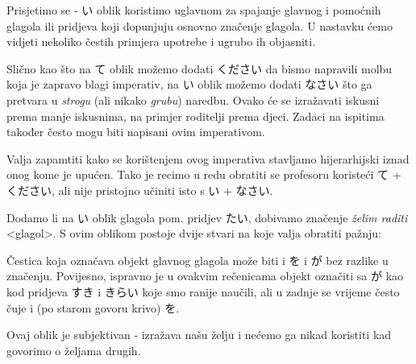 
\author{Tomislav Mamić}

	
	Prisjetimo se - い oblik koristimo uglavnom za spajanje glavnog i pomoćnih glagola ili pridjeva koji dopunjuju osnovno značenje glagola. U nastavku ćemo vidjeti nekoliko čestih primjera upotrebe i ugrubo ih objasniti.
	
	
	Slično kao što na て oblik možemo dodati ください da bismo napravili molbu koja je zapravo blagi imperativ, na い oblik možemo dodati なさい što ga pretvara u \textit{strogu} (ali nikako \textit{grubu}) naredbu. Ovako će se izražavati iskusni prema manje iskusnima, na primjer roditelji prema djeci. Zadaci na ispitima također često mogu biti napisani ovim imperativom.
	
	\begin{reibun}
	\end{reibun}

	Valja zapamtiti kako se korištenjem ovog imperativa stavljamo hijerarhijski iznad onog kome je upućen. Tako je recimo u redu obratiti se profesoru koristeći て + ください, ali nije pristojno učiniti isto s い + なさい.
	
	
	Dodamo li na い oblik glagola pom. pridjev たい, dobivamo značenje \textit{želim raditi} <glagol>. S ovim oblikom postoje dvije stvari na koje valja obratiti pažnju:
	\begin{hyou}
		\item Čestica koja označava objekt glavnog glagola može biti i を i が bez razlike u značenju. Povijesno, ispravno je u ovakvim rečenicama objekt označiti sa が kao kod pridjeva すき i きらい koje smo ranije naučili, ali u zadnje se vrijeme često čuje i (po starom govoru krivo) を.
		\item Ovaj oblik je subjektivan - izražava našu želju i nećemo ga nikad koristiti kad govorimo o željama drugih.
	\end{hyou}


